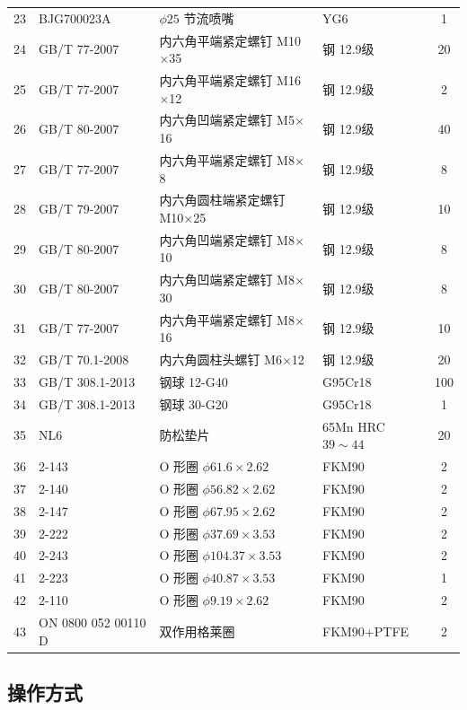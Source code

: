 \begin{table}[htbp]
\begin{tabular}{clllc}
        23 & BJG700023A & $\phi 25$ 节流喷嘴 & YG6 & 1 \\
        24 & GB/T 77-2007 & 内六角平端紧定螺钉 M10$\times$35 & 钢 12.9级 & 20 \\
        25 & GB/T 77-2007 & 内六角平端紧定螺钉 M16$\times$12 & 钢 12.9级 & 2 \\
        26 & GB/T 80-2007 & 内六角凹端紧定螺钉 M5$\times$16 & 钢 12.9级 & 40 \\
        27 & GB/T 77-2007 & 内六角平端紧定螺钉 M8$\times$8 & 钢 12.9级 & 8 \\
        28 & GB/T 79-2007 & 内六角圆柱端紧定螺钉 M10$\times$25 & 钢 12.9级 & 10 \\
        29 & GB/T 80-2007 & 内六角凹端紧定螺钉 M8$\times$10 & 钢 12.9级 & 8 \\
        30 & GB/T 80-2007 & 内六角凹端紧定螺钉 M8$\times$30 & 钢 12.9级 & 8 \\
        31 & GB/T 77-2007 & 内六角平端紧定螺钉 M8$\times$16 & 钢 12.9级 & 10 \\
        32 & GB/T 70.1-2008 & 内六角圆柱头螺钉 M6$\times$12 & 钢 12.9级 & 20 \\
        33 & GB/T 308.1-2013 & 钢球 12-G40 & G95Cr18 & 100 \\
        34 & GB/T 308.1-2013 & 钢球 30-G20 & G95Cr18 & 1 \\
        35 & NL6 & 防松垫片 & 65Mn HRC$39\sim44$ & 20 \\
        36 & 2-143 & O 形圈 $\phi 61.6\times2.62$ & FKM90 & 2 \\
        37 & 2-140 & O 形圈 $\phi 56.82\times2.62$ & FKM90 & 2 \\
        38 & 2-147 & O 形圈 $\phi 67.95\times2.62$ & FKM90 & 2 \\
        39 & 2-222 & O 形圈 $\phi 37.69\times3.53$ & FKM90 & 2 \\
        40 & 2-243 & O 形圈 $\phi 104.37\times3.53$ & FKM90 & 2 \\
        41 & 2-223 & O 形圈 $\phi 40.87\times3.53$ & FKM90 & 1 \\
        42 & 2-110 & O 形圈 $\phi 9.19\times2.62$ & FKM90 & 2 \\
        43 & ON 0800 052 00110 D & 双作用格莱圈 & FKM90+PTFE & 2 \\
        \bottomrule
    \end{tabular}
\end{table}


\subsection{操作方式}

